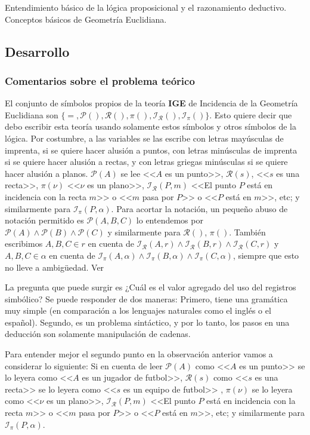 Entendimiento básico de la lógica proposicional y el razonamiento deductivo. Conceptos básicos de Geometría Euclidiana.

\subsection{Desarrollo}

\subsubsection{Comentarios sobre el problema teórico}

El conjunto de símbolos propios de la teoría \textbf{IGE} de Incidencia de la Geometría Euclidiana son $\{ =, \mathcal{P}(), \mathcal{R}(), \pi(), \mathcal{I}_{\mathcal{R}}(), \mathcal{I}_{\pi}() \}$. Esto quiere decir que debo escribir esta teoría usando solamente estos símbolos y otros símbolos de la lógica. Por costumbre, a las variables se las escribe con letras mayúsculas de imprenta, si se quiere hacer alusión a puntos, con letras minúsculas de imprenta si se quiere hacer alusión a rectas, y con letras griegas minúsculas si se quiere hacer alusión a planos. $\mathcal{P}(A)$ se lee <<$A$ es un punto>>, $\mathcal{R}(s)$, <<$s$ es una recta>>, $\pi(\nu)$ <<$\nu$ es un plano>>, $\mathcal{I}_{\mathcal{R}}(P,m)$ <<El punto $P$ está en incidencia con la recta $m$>> o <<$m$ pasa por $P$>> o <<$P$ está en $m$>>, etc; y similarmente para $\mathcal{I}_{\pi}(P,\alpha)$. Para acortar la notación, un pequeño abuso de notación permitido es $\mathcal{P}(A,B,C)$ lo entendemos por $\mathcal{P}(A) \wedge \mathcal{P}(B) \wedge \mathcal{P}(C)$ y similarmente para $\mathcal{R}()$, $\pi()$. También escribimos $A,B,C \in r$ en cuenta de $\mathcal{I}_{\mathcal{R}}(A,r) \wedge \mathcal{I}_{\mathcal{R}}(B,r) \wedge \mathcal{I}_{\mathcal{R}}(C,r)$ y $A,B,C \in \alpha$ en cuenta de $\mathcal{I}_{\pi}(A,\alpha) \wedge \mathcal{I}_{\pi}(B,\alpha) \wedge \mathcal{I}_{\pi}(C,\alpha)$, siempre que esto no lleve a ambigüedad. Ver \textcite{margaris1990first11}

\begin{observacion}
	La pregunta que puede surgir es ¿Cuál es el valor agregado del uso del registros simbólico? Se puede responder de dos maneras: Primero, tiene una gramática muy simple (en comparación a los lenguajes naturales como el inglés o el español). Segundo, es un problema sintáctico, y por lo tanto, los pasos en una deducción son solamente manipulación de cadenas.
	
	Para entender mejor el segundo punto en la observación anterior vamos a considerar lo siguiente: Si en cuenta de leer $\mathcal{P}(A)$ como <<$A$ es un punto>> se lo leyera como <<$A$ es un jugador de futbol>>, $\mathcal{R}(s)$ como <<$s$ es una recta>> se lo leyera como <<$s$ es un equipo de futbol>> , $\pi(\nu)$ se lo leyera como <<$\nu$ es un plano>>, $\mathcal{I}_{\mathcal{R}}(P,m)$ <<El punto $P$ está en incidencia con la recta $m$>> o <<$m$ pasa por $P$>> o <<$P$ está en $m$>>, etc; y similarmente para $\mathcal{I}_{\pi}(P,\alpha)$.
\end{observacion}

